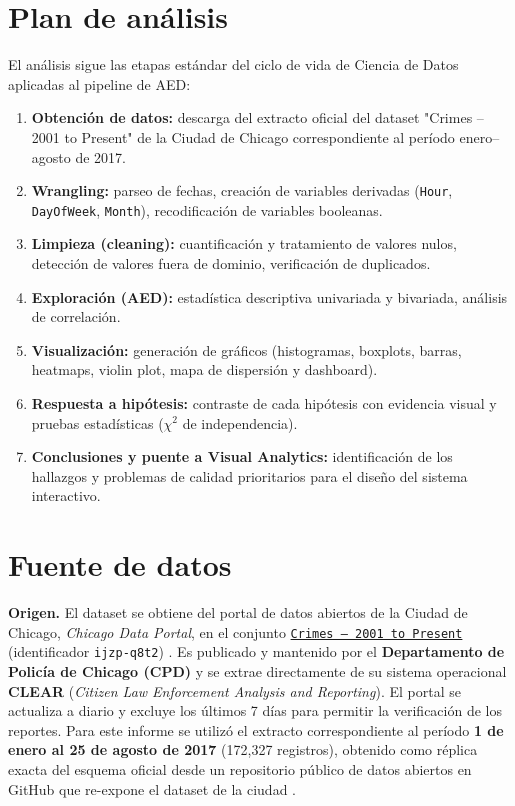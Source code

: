 \documentclass[11pt,a4paper]{article}
\begin{document}
\section{Plan de análisis}

El análisis sigue las etapas estándar del ciclo de vida de Ciencia de Datos
aplicadas al pipeline de AED:

\begin{enumerate}
    \item \textbf{Obtención de datos:} descarga del extracto oficial del
    dataset "Crimes -- 2001 to Present" de la Ciudad de Chicago
    correspondiente al período enero--agosto de 2017.
    \item \textbf{Wrangling:} parseo de fechas, creación de variables
    derivadas (\texttt{Hour}, \texttt{DayOfWeek}, \texttt{Month}),
    recodificación de variables booleanas.
    \item \textbf{Limpieza (cleaning):} cuantificación y tratamiento de
    valores nulos, detección de valores fuera de dominio, verificación de
    duplicados.
    \item \textbf{Exploración (AED):} estadística descriptiva univariada y
    bivariada, análisis de correlación.
    \item \textbf{Visualización:} generación de gráficos (histogramas,
    boxplots, barras, heatmaps, violin plot, mapa de dispersión y dashboard).
    \item \textbf{Respuesta a hipótesis:} contraste de cada hipótesis con
    evidencia visual y pruebas estadísticas ($\chi^2$ de independencia).
    \item \textbf{Conclusiones y puente a Visual Analytics:} identificación
    de los hallazgos y problemas de calidad prioritarios para el diseño del
    sistema interactivo.
\end{enumerate}

\section{Fuente de datos}

\textbf{Origen.} El dataset se obtiene del portal de datos abiertos de la
Ciudad de Chicago, \textit{Chicago Data Portal}, en el conjunto
\href{https://data.cityofchicago.org/Public-Safety/Crimes-2001-to-Present/ijzp-q8t2}{\texttt{Crimes -- 2001 to Present}}
(identificador \texttt{ijzp-q8t2}) \cite{chicagoportal}. Es publicado y
mantenido por el \textbf{Departamento de Policía de Chicago (CPD)} y se
extrae directamente de su sistema operacional \textbf{CLEAR} (\textit{Citizen
Law Enforcement Analysis and Reporting}). El portal se actualiza a diario y
excluye los últimos 7 días para permitir la verificación de los reportes.
Para este informe se utilizó el extracto correspondiente al período
\textbf{1 de enero al 25 de agosto de 2017} (172,327 registros), obtenido
como réplica exacta del esquema oficial desde un repositorio público de
datos abiertos en GitHub que re-expone el dataset de la ciudad
\cite{githubmirror}.
\end{document}
